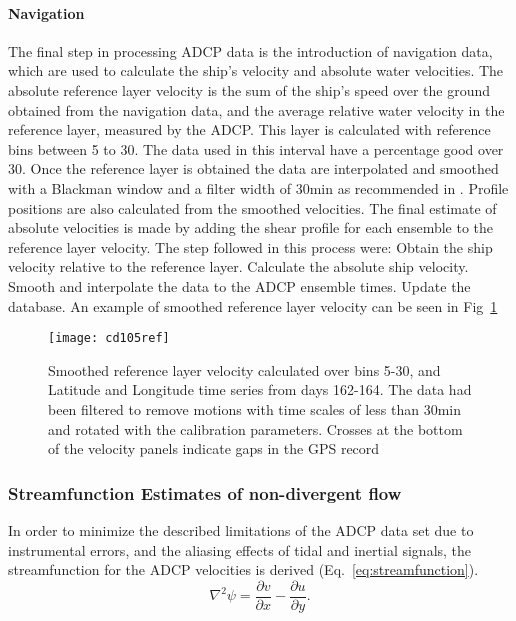 \paragraph{Navigation} The final step in processing ADCP data is the
introduction of navigation data, which are used to calculate the
ship's velocity and absolute water velocities. The absolute
reference layer velocity is the sum of the ship's speed over the
ground obtained from the navigation data, and the average relative
water velocity in the reference layer, measured by the ADCP.  This
layer is calculated with reference bins between 5 to 30. The data
used in this interval have a percentage good over 30. Once the
reference layer is obtained the data are interpolated and smoothed
with a Blackman window and a filter width of 30min as recommended
in \cite{codas}. Profile positions are also calculated from the
smoothed velocities. The final estimate of absolute velocities is
made by adding the shear profile for each ensemble to the
reference layer velocity. The step followed in this process were:
Obtain  the ship velocity relative to the reference layer.
Calculate the absolute ship velocity. Smooth and interpolate the
data to the ADCP ensemble times. Update the database. An example
of smoothed reference layer velocity can be seen in
Fig~\ref{fig:cd105ref}
\begin{figure}
  \centering
  \texttt{[image: cd105ref]}
  \caption{Smoothed reference layer velocity calculated over bins 5-30, and
  Latitude and Longitude time series from days 162-164.
  The data had been filtered to remove motions with time scales of less
  than 30min and rotated with the calibration parameters.
  Crosses at the bottom of the velocity panels
  indicate gaps in the GPS record}\label{fig:cd105ref}
\end{figure}

\subsubsection{Streamfunction Estimates of non-divergent flow}
In order to minimize the described limitations of the ADCP data
set due to instrumental errors, and the aliasing effects of tidal
and inertial signals, the streamfunction for the ADCP velocities
is derived (Eq.~\ref{eq:streamfunction}).
\begin{equation}\label{eq:streamfunction}
  \nabla^{2}\psi=\frac{\partial v}{\partial x} - \frac{\partial
  u}{\partial y}.
\end{equation}

